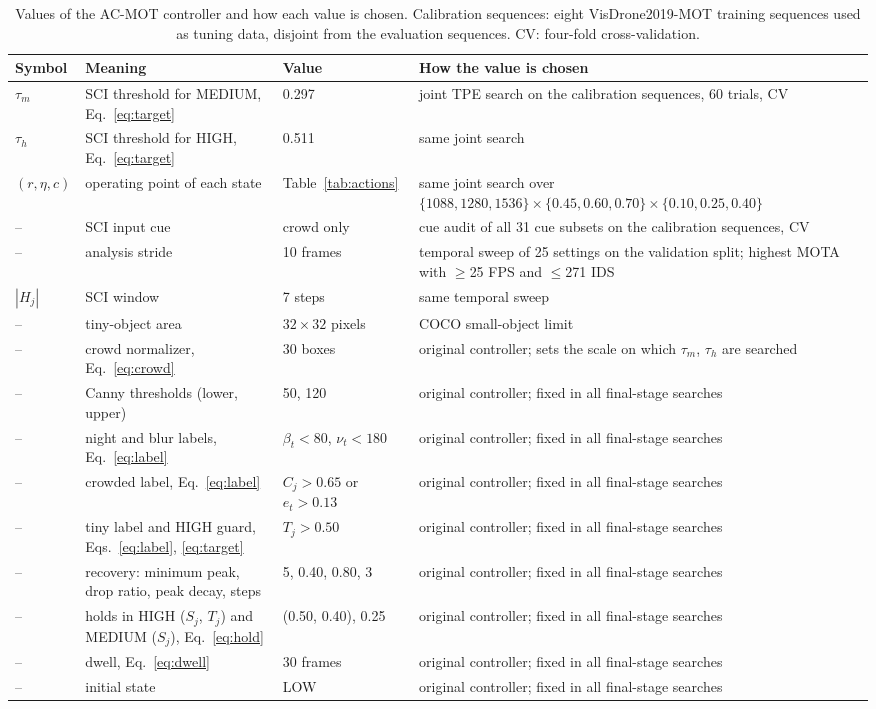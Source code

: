\documentclass[pdflatex,sn-mathphys-num,iicol]{sn-jnl}
\begin{document}
\begin{table}[t]
\caption{Values of the AC-MOT controller and how each value is chosen.
Calibration sequences: eight VisDrone2019-MOT training sequences used as
tuning data, disjoint from the evaluation sequences. CV: four-fold
cross-validation.}
\label{tab:constants}
\centering\footnotesize
\setlength{\tabcolsep}{4pt}
\begin{tabular}{@{}l>{\raggedright\arraybackslash}p{50mm}l>{\raggedright\arraybackslash}p{62mm}@{}}
\toprule
Symbol & Meaning & Value & How the value is chosen\\
\midrule
$\tau_m$ & SCI threshold for MEDIUM, Eq.~\eqref{eq:target} & 0.297 & joint TPE search on the calibration sequences, 60 trials, CV\\
$\tau_h$ & SCI threshold for HIGH, Eq.~\eqref{eq:target} & 0.511 & same joint search\\
$(r,\eta,c)$ & operating point of each state & Table~\ref{tab:actions} & same joint search over $\{1088,1280,1536\}\times\{0.45,0.60,0.70\}\times\{0.10,0.25,0.40\}$\\
-- & SCI input cue & crowd only & cue audit of all 31 cue subsets on the calibration sequences, CV\\
-- & analysis stride & 10 frames & temporal sweep of 25 settings on the validation split; highest MOTA with $\geq$25 FPS and $\leq$271 IDS\\
$|H_j|$ & SCI window & 7 steps & same temporal sweep\\
-- & tiny-object area & $32\times32$ pixels & COCO small-object limit \cite{lin2014coco}\\
-- & crowd normalizer, Eq.~\eqref{eq:crowd} & 30 boxes & original controller; sets the scale on which $\tau_m$, $\tau_h$ are searched\\
-- & Canny thresholds (lower, upper) & 50, 120 & original controller; fixed in all final-stage searches\\
-- & night and blur labels, Eq.~\eqref{eq:label} & $\beta_t<80$, $\nu_t<180$ & original controller; fixed in all final-stage searches\\
-- & crowded label, Eq.~\eqref{eq:label} & $C_j>0.65$ or $e_t>0.13$ & original controller; fixed in all final-stage searches\\
-- & tiny label and HIGH guard, Eqs.~\eqref{eq:label}, \eqref{eq:target} & $T_j>0.50$ & original controller; fixed in all final-stage searches\\
-- & recovery: minimum peak, drop ratio, peak decay, steps & 5, 0.40, 0.80, 3 & original controller; fixed in all final-stage searches\\
-- & holds in HIGH ($S_j$, $T_j$) and MEDIUM ($S_j$), Eq.~\eqref{eq:hold} & (0.50, 0.40), 0.25 & original controller; fixed in all final-stage searches\\
-- & dwell, Eq.~\eqref{eq:dwell} & 30 frames & original controller; fixed in all final-stage searches\\
-- & initial state & LOW & original controller; fixed in all final-stage searches\\
\bottomrule
\end{tabular}
\end{table}
\end{document}
